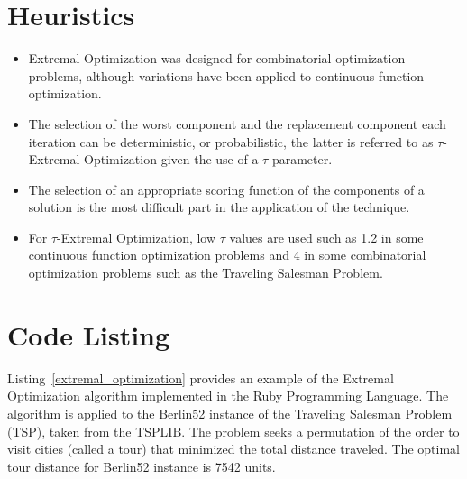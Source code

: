 \documentclass[a4paper, 11pt]{article}
\begin{document}
\section{Heuristics}
\label{sec:heuristics}
\begin{itemize}
	\item Extremal Optimization was designed for combinatorial optimization problems, although variations have been applied to continuous function optimization.
	\item The selection of the worst component and the replacement component each iteration can be deterministic, or probabilistic, the latter is referred to as $\tau$-Extremal Optimization given the use of a $\tau$ parameter.
	\item The selection of an appropriate scoring function of the components of a solution is the most difficult part in the application of the technique.
	\item For $\tau$-Extremal Optimization, low $\tau$ values are used such as 1.2 in some continuous function optimization problems and 4 in some combinatorial optimization problems such as the Traveling Salesman Problem.
\end{itemize}

\section{Code Listing}
\label{sec:code}
Listing~\ref{extremal_optimization} provides an example of the Extremal Optimization algorithm implemented in the Ruby Programming Language. 
The algorithm is applied to the Berlin52 instance of the Traveling Salesman Problem (TSP), taken from the TSPLIB. The problem seeks a permutation of the order to visit cities (called a tour) that minimized the total distance traveled. The optimal tour distance for Berlin52 instance is 7542 units.
\end{document}
